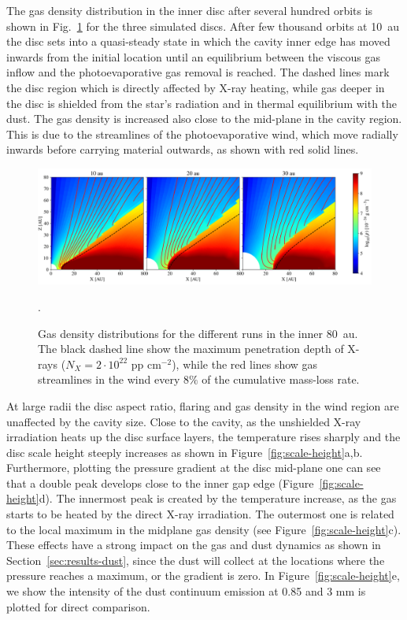 \documentclass[fleqn,usenatbib]{mnras}
\begin{document}
        The gas density distribution in the inner disc after several hundred orbits is shown in Fig.~\ref{fig:GasDist} for the three simulated discs. After few thousand orbits at \SI{10}{au} the disc sets into a quasi-steady state in which the cavity inner edge has moved inwards from the initial location until an equilibrium between the viscous gas inflow and the photoevaporative gas removal is reached.
        The dashed lines mark the disc region which is directly affected by X-ray heating, while gas deeper in the disc is shielded from the star's radiation and in thermal equilibrium with the dust.
        The gas density is increased also close to the mid-plane in the cavity region. 
        This is due to the streamlines of the photoevaporative wind, which move radially inwards before carrying material outwards, as shown with red solid lines.
        \begin{figure}
            \centering
            \includegraphics[width=\textwidth]{dens.png}
            \caption{Gas density distributions for the different runs in the inner \SI{80}{au}. The black dashed line show the maximum penetration depth of X-rays ($N_X = 2\cdot 10^{22}$ pp cm$^{-2}$), while the red lines show gas streamlines in the wind every $8\%$ of the cumulative mass-loss rate.}.
            \label{fig:GasDist}
        \end{figure}
        At large radii the disc aspect ratio, flaring and gas density in the wind region are unaffected by the cavity size.
        Close to the cavity, as the unshielded X-ray irradiation heats up the disc surface layers, the temperature rises sharply and the disc scale height steeply increases as shown in Figure~\ref{fig:scale-height}a,b. Furthermore, plotting the pressure gradient at the disc mid-plane one can see that a double peak develops close to the inner gap edge (Figure~\ref{fig:scale-height}d).
        The innermost peak is created by the temperature increase, as the gas starts to be heated by the direct X-ray irradiation. The outermost one is related to the local maximum in the midplane gas density (see Figure~\ref{fig:scale-height}c).
        These effects have a strong impact on the gas and dust dynamics as shown in Section~\ref{sec:results-dust}, since the dust will collect at the locations where the pressure reaches a maximum, or the gradient is zero. In Figure~\ref{fig:scale-height}e, we show the intensity of the dust continuum emission at 0.85 and 3 mm is plotted for direct comparison.
        
\end{document}
